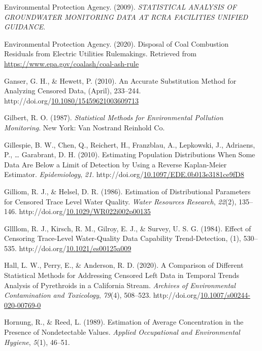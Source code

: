 \documentclass[12pt, twoside]{amherstthesis}
\newenvironment{CSLReferences}%
  {}%
  {\par}
\begin{document}
\begin{CSLReferences}{1}{0}
\leavevmode\hypertarget{ref-EPA2009}{}%
Environmental Protection Agency. (2009). \emph{{STATISTICAL ANALYSIS OF GROUNDWATER MONITORING DATA AT RCRA FACILITIES UNIFIED GUIDANCE}}.

\leavevmode\hypertarget{ref-Car2020}{}%
Environmental Protection Agency. (2020). {Disposal of Coal Combustion Residuals from Electric Utilities Rulemakings}. Retrieved from \url{https://www.epa.gov/coalash/coal-ash-rule}

\leavevmode\hypertarget{ref-Ganser2010}{}%
Ganser, G. H., \& Hewett, P. (2010). {An Accurate Substitution Method for Analyzing Censored Data}, (April), 233--244. http://doi.org/\href{https://doi.org/10.1080/15459621003609713}{10.1080/15459621003609713}

\leavevmode\hypertarget{ref-Gilbert1987}{}%
Gilbert, R. O. (1987). \emph{{Statistical Methods for Environmental Pollution Monitoring}}. New York: Van Nostrand Reinhold Co.

\leavevmode\hypertarget{ref-Gillespie2010}{}%
Gillespie, B. W., Chen, Q., Reichert, H., Franzblau, A., Lepkowski, J., Adriaens, P., \ldots{} Garabrant, D. H. (2010). {Estimating Population Distributions When Some Data Are Below a Limit of Detection by Using a Reverse Kaplan-Meier Estimator}. \emph{Epidemiology}, \emph{21}. http://doi.org/\href{https://doi.org/10.1097/EDE.0b013e3181ce9fD8}{10.1097/EDE.0b013e3181ce9fD8}

\leavevmode\hypertarget{ref-Gilliom1986}{}%
Gilliom, R. J., \& Helsel, D. R. (1986). {Estimation of Distributional Parameters for Censored Trace Level Water Quality}. \emph{Water Resources Research}, \emph{22}(2), 135--146. http://doi.org/\href{https://doi.org/10.1029/WR022i002p00135}{10.1029/WR022i002p00135}

\leavevmode\hypertarget{ref-Gillom1984}{}%
Gllllom, R. J., Kirsch, R. M., Gilroy, E. J., \& Survey, U. S. G. (1984). {Effect of Censoring Trace-Level Water-Quality Data Capability Trend-Detection}, (1), 530--535. http://doi.org/\href{https://doi.org/10.1021/es00125a009}{10.1021/es00125a009}

\leavevmode\hypertarget{ref-Hall2020}{}%
Hall, L. W., Perry, E., \& Anderson, R. D. (2020). {A Comparison of Different Statistical Methods for Addressing Censored Left Data in Temporal Trends Analysis of Pyrethroids in a California Stream}. \emph{Archives of Environmental Contamination and Toxicology}, \emph{79}(4), 508--523. http://doi.org/\href{https://doi.org/10.1007/s00244-020-00769-0}{10.1007/s00244-020-00769-0}

\leavevmode\hypertarget{ref-Hornung1989}{}%
Hornung, R., \& Reed, L. (1989). {Estimation of Average Concentration in the Presence of Nondetectable Values}. \emph{Applied Occupational and Environmental Hygiene}, \emph{5}(1), 46--51.


\end{CSLReferences}
\end{document}
